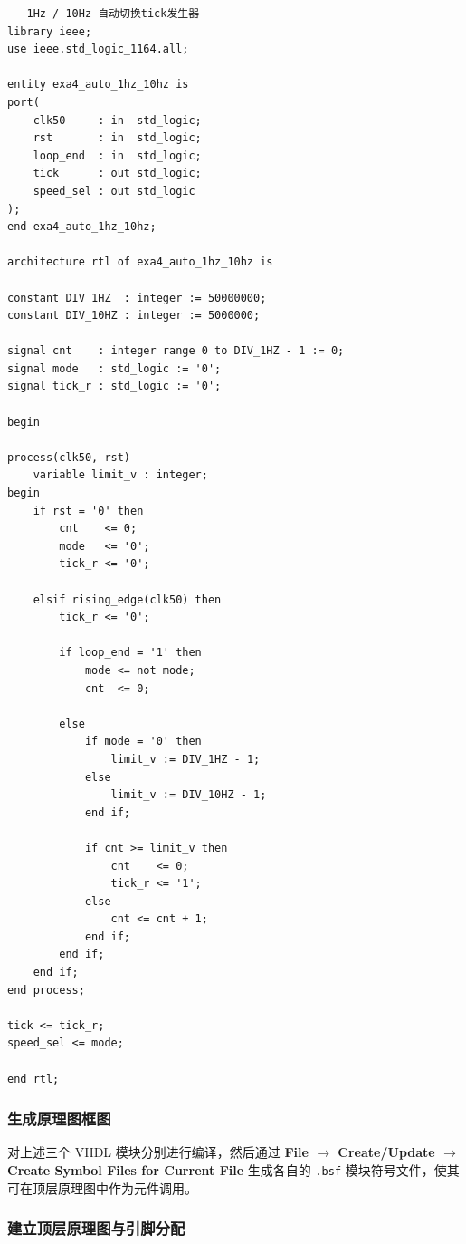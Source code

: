 \documentclass[12pt]{ctexart}
\begin{document}
\begin{verbatim}
-- 1Hz / 10Hz 自动切换tick发生器
library ieee;
use ieee.std_logic_1164.all;

entity exa4_auto_1hz_10hz is
port(
    clk50     : in  std_logic;
    rst       : in  std_logic;
    loop_end  : in  std_logic;
    tick      : out std_logic;
    speed_sel : out std_logic
);
end exa4_auto_1hz_10hz;

architecture rtl of exa4_auto_1hz_10hz is

constant DIV_1HZ  : integer := 50000000;
constant DIV_10HZ : integer := 5000000;

signal cnt    : integer range 0 to DIV_1HZ - 1 := 0;
signal mode   : std_logic := '0';
signal tick_r : std_logic := '0';

begin

process(clk50, rst)
    variable limit_v : integer;
begin
    if rst = '0' then
        cnt    <= 0;
        mode   <= '0';
        tick_r <= '0';

    elsif rising_edge(clk50) then
        tick_r <= '0';

        if loop_end = '1' then
            mode <= not mode;
            cnt  <= 0;

        else
            if mode = '0' then
                limit_v := DIV_1HZ - 1;
            else
                limit_v := DIV_10HZ - 1;
            end if;

            if cnt >= limit_v then
                cnt    <= 0;
                tick_r <= '1';
            else
                cnt <= cnt + 1;
            end if;
        end if;
    end if;
end process;

tick <= tick_r;
speed_sel <= mode;

end rtl;
\end{verbatim}
\label{lst:auto}

\subsubsection{生成原理图框图}

对上述三个 VHDL 模块分别进行编译，然后通过 \textbf{File $\rightarrow$ Create/Update $\rightarrow$ Create Symbol Files for Current File} 生成各自的 \texttt{.bsf} 模块符号文件，使其可在顶层原理图中作为元件调用。

\subsubsection{建立顶层原理图与引脚分配}
\end{document}
